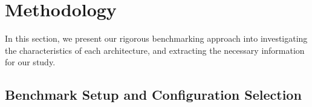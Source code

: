 \section{Methodology}\label{sec:methods}
%
In this section, we present our rigorous benchmarking approach into investigating the characteristics of each architecture, and extracting the necessary information for our study.
%

\subsection{Benchmark Setup and Configuration Selection}\label{ssec:bmconf}

